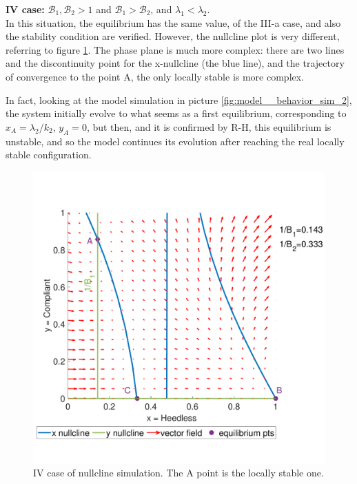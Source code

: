 \textbf{IV case: } $\mathcal{B}_1, \mathcal{B}_2 >1$ and $\mathcal{B}_1 >  \mathcal{B}_2$, and $\lambda_1 < \lambda_2$. \\
\label{par:behav_4_case}
In this situation, the equilibrium has the same value, of the III-a case, and also the stability condition are verified. However, the nullcline plot is very different, referring to figure \ref{fig:prnullclineb1_mag_b2_lambda}. The phase plane is much more complex: there are two lines and the discontinuity point for the x-nullcline (the blue line), and the trajectory of convergence to the point A, the only locally stable is more complex.  

In fact, looking at the model simulation in picture \ref{fig:model__behavior_sim_2}, the system initially evolve to what seems as a first equilibrium, corresponding to $x_A = \lambda_2/k_2$, $y_A = 0$, but then, and it is confirmed by R-H, this equilibrium is unstable, and so the model continues its evolution after reaching the real locally stable configuration. 
\begin{figure}[h]
	\centering
	\includegraphics[width=0.48\linewidth]{1_corpo/figure/behavioural_equilibrium/Pr_nullcline_B1_mag_B2_lambda2_mag}
	\caption[Nullcline fourth case]{IV case of nullcline simulation. The A point is the locally stable one.}
	\label{fig:prnullclineb1_mag_b2_lambda}
\end{figure}

